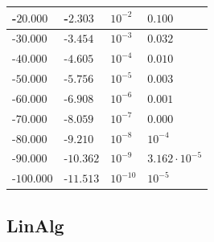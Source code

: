 \begin{center}
{\begin{tabular}{l|l|l|l}
		-$20.000$ & -$2.303$ & $10^{-2}$ & $0.100$ \\ \hline
		-$30.000$ & -$3.454$ & $10^{-3}$ & $0.032$ \\ \hline
		-$40.000$ & -$4.605$ & $10^{-4}$ & $0.010$ \\ \hline
		-$50.000$ & -$5.756$ & $10^{-5}$ & $0.003$ \\ \hline
		-$60.000$ & -$6.908$ & $10^{-6}$ & $0.001$ \\ \hline
		-$70.000$ & -$8.059$ & $10^{-7}$ & $0.000$ \\ \hline
		-$80.000$ & -$9.210$ & $10^{-8}$ & $10^{-4}$ \\ \hline
		-$90.000$ & -$10.362$ & $10^{-9}$ & $3.162 \cdot 10^{-5}$ \\ \hline
		-$100.000$ & -$11.513$ & $10^{-10}$ & $10^{-5}$ \\ \hline
	\end{tabular}
}
\end{center}

\subsection{LinAlg}
